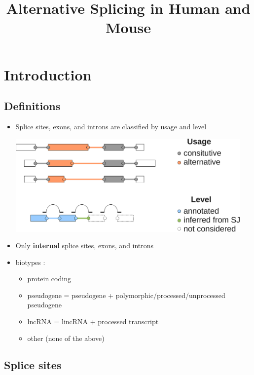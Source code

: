 \documentclass{article}
\title{Alternative Splicing in Human and Mouse}
\begin{document}
\maketitle
\tableofcontents
\listoffigures
\listoftables
\clearpage

\section{Introduction}
\subsection{Definitions}
\begin{itemize}
\item Splice sites, exons, and introns are classified by usage and level
\begin{center}
\includegraphics[height=5cm]{Latex/main_legend_1.pdf}
\end{center}
\item Only {\bf internal} splice sites, exons, and introns
\item biotypes :
\begin{itemize}
\item protein coding
\item pseudogene = pseudogene + polymorphic/processed/unprocessed pseudogene
\item lncRNA    = lincRNA + processed transcript
\item other (none of the above)
\end{itemize}
\end{itemize}
\clearpage
\subsection{Splice sites}
\end{document}

